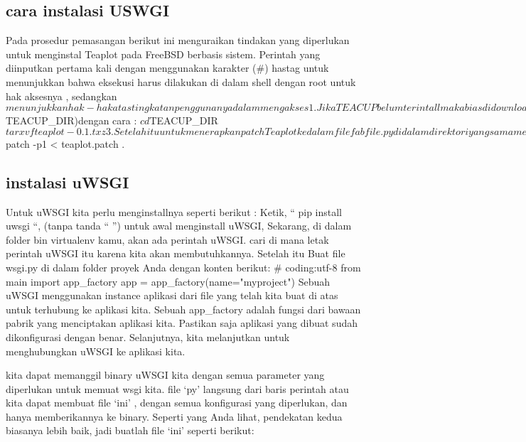 \subsection{cara instalasi USWGI}
Pada prosedur pemasangan berikut ini menguraikan tindakan yang diperlukan untuk menginstal Teaplot pada  FreeBSD berbasis sistem. Perintah yang diinputkan pertama kali  dengan menggunakan karakter  (#) hastag  untuk menunjukkan bahwa eksekusi harus dilakukan di dalam shell dengan root untuk hak aksesnya , sedangkan $ menunjukkan hak-hak atas tingkatan penggunanya dalam mengakses

1.	Jika TEACUP belum terintall maka bias didownload maelalui laman http://downloads.sourceforge.net/
	project/teacup/teacup-1.0.tar.gz. Informasi tambahan dapat diperoleh dari laporan CAIA nya.
2.	kemudian kita extract arsip instalasi Teaplotnya kedalam  TEACUP  dengan direktorinya ($TEACUP_DIR)dengan cara : 
	$ cd $TEACUP_DIR
	$ tar xvf teaplot-0.1.txz
3.	Setelah itu untuk menerapkan patch Teaplot kedalam file fabfile.py didalam direktori yang sama menggunakan peintah :
	$ patch -p1 < teaplot.patch
\cite{true150828teaplot}.

\subsection{instalasi uWSGI}
Untuk uWSGI kita perlu menginstallnya seperti berikut :
Ketik, “ pip install uwsgi “, (tanpa tanda “ ”) untuk awal menginstall uWSGI,
Sekarang, di dalam folder bin virtualenv kamu, akan ada perintah uWSGI. cari
di mana letak perintah uWSGI itu karena kita akan membutuhkannya. Setelah itu
Buat file wsgi.py di dalam folder proyek Anda dengan konten berikut:
# coding:utf-8
from main import app_factory
app = app_factory(name="myproject")
Sebuah uWSGI menggunakan instance aplikasi dari file yang telah kita buat di atas untuk terhubung ke aplikasi kita. Sebuah app_factory adalah fungsi dari bawaan pabrik yang menciptakan aplikasi kita. Pastikan saja aplikasi yang dibuat sudah dikonfigurasi dengan benar. Selanjutnya, kita melanjutkan untuk menghubungkan uWSGI ke aplikasi kita.

kita dapat memanggil binary uWSGI kita dengan semua parameter yang diperlukan untuk memuat wsgi kita. file ‘py’ langsung dari baris perintah atau kita dapat membuat file ‘ini’ , dengan semua konfigurasi yang diperlukan, dan hanya memberikannya ke binary. Seperti yang Anda lihat, pendekatan kedua biasanya lebih baik, jadi buatlah file ‘ini’ seperti berikut:

